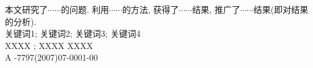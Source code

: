 
\begin{center}
\begin{minipage}[c]{14cm}
 \mbox{}\hspace{2.4em}{\heiti 摘~要:}\quad
本文研究了$\cdots\cdots$的问题. 利用$\cdots\cdots$的方法,
获得了$\cdots\cdots$结果,
推广了$\cdots\cdots$结果(即对结果的分析). \\
\mbox{}\hspace{2.4em}{\heiti 关\,键\,词:}\quad 关键词1; 关键词2; 关键词3; 关键词4\\
\mbox{}\hspace{2.4em}{\heiti MR(2010)主题分类号:}\quad
XXXX ; XXXX \quad \quad \quad
\mbox{}\hspace{2.4em}{\heiti 中\,图\,分\,类\,号:}\quad
XXXX  \\
\mbox{}\hspace{2.4em}{\heiti 文\,献\,标\,识\,码: }\quad A
\quad \quad \quad
\mbox{}\hspace{2.4em}{\heiti 文\,章\,编\,号:}-7797(2007)07-0001-00\\
\end{minipage}
\end{center}